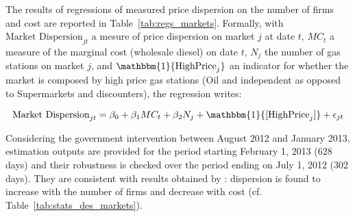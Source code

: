 \documentclass[english]{article}
\begin{document}
The results of regressions of measured price dispersion on the number of firms and cost are reported in Table~\ref{tab:regs_markets}. Formally, with $\text{Market Dispersion}_{jt}$ a mesure of price dispersion on market $j$ at date $t$, $MC_t$ a measure of the marginal cost (wholesale diesel) on date $t$, $N_j$ the number of gas stations on market $j$, and $\mathbbm{1}{\text{HighPrice}_{j}}$ an indicator for whether the market is composed by high price gas stations (Oil and independent as opposed to Supermarkets and discounters), the regression writes:

\begin{equation}
\text{Market Dispersion}_{jt}= \beta_0 + \beta_1 MC_t + \beta_2 N_j + \mathbbm{1}{[\text{HighPrice}_{j}]} + \epsilon_{jt}
\end{equation}

Considering the government intervention between August 2012 and January 2013, estimation outputs are provided for the period starting February 1, 2013 (628 days) and their robustness is checked over the period ending on July 1, 2012 (302 days). They are consistent with results obtained by \cite{TAP11}: dispersion is found to increase with the number of firms and decrease with cost (cf. Table~\ref{tab:stats_des_markets}).
\end{document}
